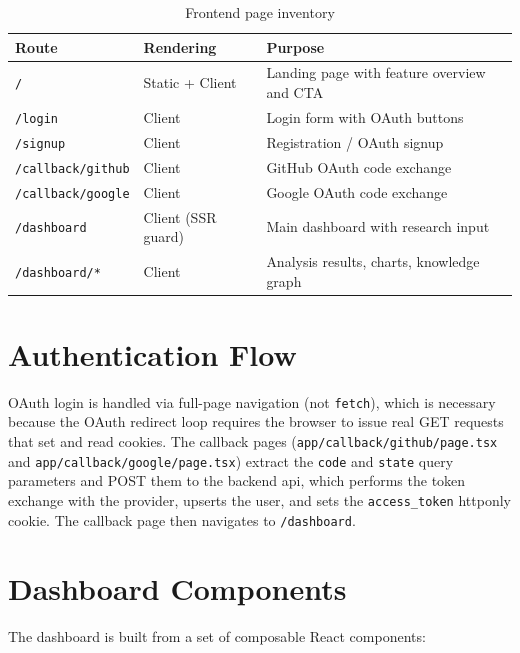 \documentclass[12pt,a4paper,oneside]{book}
\begin{document}
\begin{table}[H]
\centering
\caption{Frontend page inventory}
\label{tab:frontend_pages}
\begin{tabularx}{\textwidth}{llX}
\toprule
\textbf{Route} & \textbf{Rendering} & \textbf{Purpose} \\
\midrule
\texttt{/}                & Static + Client & Landing page with feature overview and CTA \\
\texttt{/login}           & Client          & Login form with OAuth buttons \\
\texttt{/signup}          & Client          & Registration / OAuth signup \\
\texttt{/callback/github} & Client          & GitHub OAuth code exchange \\
\texttt{/callback/google} & Client          & Google OAuth code exchange \\
\texttt{/dashboard}       & Client (SSR guard) & Main dashboard with research input \\
\texttt{/dashboard/*}     & Client          & Analysis results, charts, knowledge graph \\
\bottomrule
\end{tabularx}
\end{table}

\section{Authentication Flow}

OAuth login is handled via full-page navigation (not \texttt{fetch}), which is necessary because the OAuth redirect loop requires the browser to issue real GET requests that set and read cookies. The callback pages (\texttt{app/callback/github/page.tsx} and \texttt{app/callback/google/page.tsx}) extract the \texttt{code} and \texttt{state} query parameters and POST them to the backend \gls{api}, which performs the token exchange with the provider, upserts the user, and sets the \texttt{access\_token} httponly cookie. The callback page then navigates to \texttt{/dashboard}.

\section{Dashboard Components}

The dashboard is built from a set of composable React components:
\end{document}
